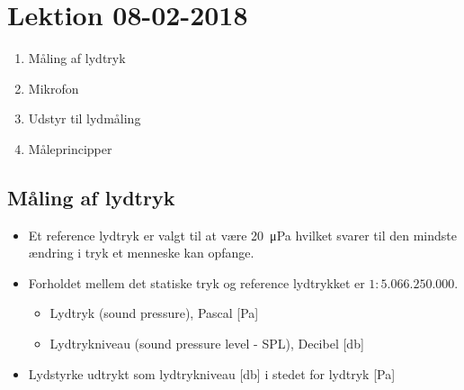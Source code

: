 \section{Lektion 08-02-2018}

\begin{enumerate}
	\item Måling af lydtryk
	\item Mikrofon
	\item Udstyr til lydmåling
	\item Måleprincipper
\end{enumerate}

\noindent{} \vspace{3mm}

\subsection{Måling af lydtryk}
\begin{itemize}
	\item Et reference lydtryk er valgt til at være \SI{20}{\micro\pascal} hvilket svarer til den mindste ændring i tryk et menneske kan opfange.
	\item Forholdet mellem det statiske tryk og reference lydtrykket er $1 :
	5.066.250.000$.
	\begin{itemize}
		\item Lydtryk (sound pressure),  Pascal [\si{\pascal}]
		\item Lydtrykniveau (sound pressure level - SPL), Decibel [\si{\decibel}]
	\end{itemize}
\end{itemize}

\begin{itemize}
	\item Lydstyrke udtrykt som lydtrykniveau [\si{\decibel}] i stedet for lydtryk [\si{\pascal}]
\end{itemize}

